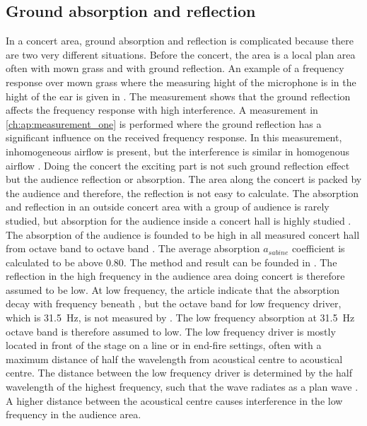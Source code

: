 \subsection{Ground absorption and reflection}\label{ana:ground_ref}
In a concert area, ground absorption and reflection is complicated because there are two very different situations. Before the concert, the area is a local plan area often with mown grass and with ground reflection.  An example of a frequency response over mown grass where the measuring hight of the microphone is in the hight of the ear is given in \citep{review_of_sound}. The measurement shows that the ground reflection affects the frequency response with high interference. 
A measurement in \autoref{ch:ap:measurement_one} is performed where the ground reflection has a significant influence on the received frequency response. In this measurement, inhomogeneous airflow is present, but the interference is similar in homogenous airflow \citep{review_of_sound}. Doing the concert the exciting part is not such ground reflection effect but the audience reflection or absorption.  The area along the concert is packed by the audience and therefore, the reflection is not easy to calculate. The absorption and reflection in an outside concert area with a group of audience is rarely studied, but absorption for the audience inside a concert hall is highly studied \citep{audience_abso}. The absorption of the audience is founded to be high in all measured concert hall from  octave band to  octave band \citep{audience_abso}. The average absorption $a_{sabine}$ coefficient is calculated to be above 0.80. The method and result can be founded in \citep{audience_abso}. The reflection in the high frequency in the audience area doing concert is therefore assumed to be low. At low frequency, the article \citep{audience_abso} indicate that the absorption decay with frequency beneath  , but the octave band for low frequency driver, which is \SI{31.5}{\hertz}, is not measured by \citep{audience_abso}. The low frequency absorption at \SI{31.5}{\hertz} octave band is therefore assumed to low. The low frequency driver is mostly located in front of the stage on a line or in end-fire settings, often with a maximum distance of half the wavelength from acoustical centre to acoustical centre. The distance between the low frequency driver is determined by the half wavelength of the highest frequency, such that the wave radiates as a plan wave \citep{bauman2001wavefront}. A higher distance between the acoustical centre causes interference in the low frequency in the audience area. 



